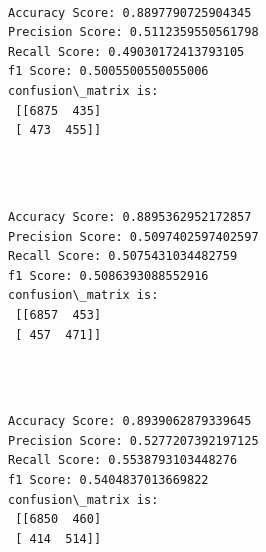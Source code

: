 \documentclass[11pt]{article}
\begin{document}
    \begin{center}
    \end{center}
    { \hspace*{\fill} \\}
    
    \begin{Verbatim}[commandchars=\\\{\}]
Accuracy Score: 0.8897790725904345
Precision Score: 0.5112359550561798
Recall Score: 0.49030172413793105
f1 Score: 0.5005500550055006
confusion\_matrix is: 
 [[6875  435]
 [ 473  455]] 


    \end{Verbatim}

    \begin{center}
    \end{center}
    { \hspace*{\fill} \\}
    
    \begin{Verbatim}[commandchars=\\\{\}]
Accuracy Score: 0.8895362952172857
Precision Score: 0.5097402597402597
Recall Score: 0.5075431034482759
f1 Score: 0.5086393088552916
confusion\_matrix is: 
 [[6857  453]
 [ 457  471]] 


    \end{Verbatim}

    \begin{center}
    \end{center}
    { \hspace*{\fill} \\}
    
    \begin{Verbatim}[commandchars=\\\{\}]
Accuracy Score: 0.8939062879339645
Precision Score: 0.5277207392197125
Recall Score: 0.5538793103448276
f1 Score: 0.5404837013669822
confusion\_matrix is: 
 [[6850  460]
 [ 414  514]] 


    \end{Verbatim}

    \begin{center}
    \end{center}
    { \hspace*{\fill} \\}
    
\end{document}
